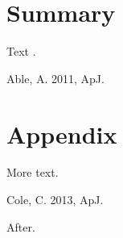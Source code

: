 \documentclass{article}
\begin{document}
\section{Summary}
Text \citep{a,c}.
\begin{small}
 Able, A. 2011, ApJ.

\section*{Appendix}
More text.

 Cole, C. 2013, ApJ.
\end{small}
After.
\end{document}
